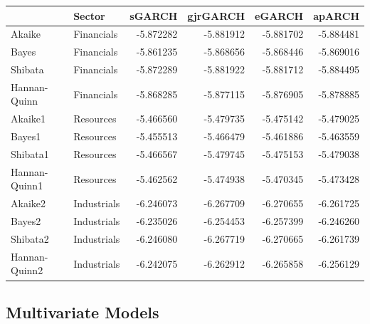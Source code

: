 \documentclass[12pt,preprint, authoryear]{elsarticle}
\let\origtable\table
\let\endorigtable\endtable
\renewenvironment{table}[1][2] {
    \expandafter\origtable\expandafter[H]
} {
    \endorigtable
}
\numberwithin{equation}{section}
\numberwithin{figure}{section}
\numberwithin{table}{section}
\begin{document}
\begin{table}

\caption{\label{tab:unnamed-chunk-6}GARCH Model Comparison Results}
\centering
\begin{tabular}[t]{l|l|r|r|r|r}
\hline
  & Sector & sGARCH & gjrGARCH & eGARCH & apARCH\\
\hline
Akaike & Financials & -5.872282 & -5.881912 & -5.881702 & -5.884481\\
\hline
Bayes & Financials & -5.861235 & -5.868656 & -5.868446 & -5.869016\\
\hline
Shibata & Financials & -5.872289 & -5.881922 & -5.881712 & -5.884495\\
\hline
Hannan-Quinn & Financials & -5.868285 & -5.877115 & -5.876905 & -5.878885\\
\hline
Akaike1 & Resources & -5.466560 & -5.479735 & -5.475142 & -5.479025\\
\hline
Bayes1 & Resources & -5.455513 & -5.466479 & -5.461886 & -5.463559\\
\hline
Shibata1 & Resources & -5.466567 & -5.479745 & -5.475153 & -5.479038\\
\hline
Hannan-Quinn1 & Resources & -5.462562 & -5.474938 & -5.470345 & -5.473428\\
\hline
Akaike2 & Industrials & -6.246073 & -6.267709 & -6.270655 & -6.261725\\
\hline
Bayes2 & Industrials & -6.235026 & -6.254453 & -6.257399 & -6.246260\\
\hline
Shibata2 & Industrials & -6.246080 & -6.267719 & -6.270665 & -6.261739\\
\hline
Hannan-Quinn2 & Industrials & -6.242075 & -6.262912 & -6.265858 & -6.256129\\
\hline
\end{tabular}
\end{table}

\hypertarget{multivariate-models}{%
\subsection{Multivariate Models}\label{multivariate-models}}
\end{document}
